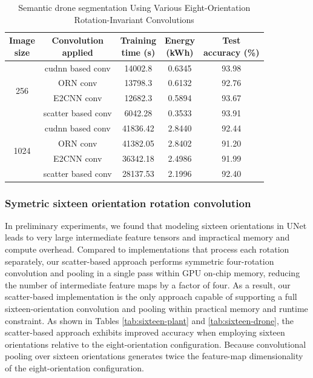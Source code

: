 \begin{table}[ht]
\centering
\caption{Semantic drone segmentation Using Various Eight-Orientation Rotation-Invariant Convolutions}
\renewcommand{\arraystretch}{1.2}
\begin{tabular}{c|c|c|c|c} 
\hline\hline
\shortstack{Image\\size} & 
\shortstack{Convolution\\applied} & 
\shortstack{Training\\time (s)} &  
\shortstack{Energy\\(kWh)} &  
\shortstack{Test\\accuracy (\%)} \\ 
\hline
\hline
\multirow{4}{*}{256} 
 & cudnn based conv    &14002.8  &0.6345 &93.98  \\ \cline{2-5}
 & ORN conv    &13798.3  &0.6132  &92.76  \\ \cline{2-5}
 & E2CNN conv    &12682.3 &0.5894  &93.67  \\ \cline{2-5}
 & scatter based conv  &6042.28  & 0.3533 &93.91  \\
\hline
\multirow{4}{*}{1024}
  & cudnn based conv    &41836.42  &2.8440 &92.44 \\ \cline{2-5}
  & ORN conv            &41382.05  &2.8402 &91.20 \\ \cline{2-5}
  & E2CNN conv          &36342.18  &2.4986 &91.99 \\ \cline{2-5}
  & scatter based conv  &28137.53  &2.1996 &92.40 \\
\hline
\end{tabular}
\label{tab:eight-drone}
\end{table}


\subsubsection{Symetric sixteen orientation rotation convolution}\label{subsubsec:sixteenOri}
In preliminary experiments, we found that modeling sixteen orientations in UNet leads to very large intermediate feature tensors and impractical memory and compute overhead. Compared to implementations that process each rotation separately, our scatter-based approach performs symmetric four-rotation convolution and pooling in a single pass within GPU on-chip memory, reducing the number of intermediate feature maps by a factor of four. As a result, our scatter-based implementation is the only approach capable of supporting a full sixteen-orientation convolution and pooling within practical memory and runtime constraint. As shown in Tables \ref{tab:sixteen-plant} and \ref{tab:sixteen-drone}, the scatter-based approach exhibits improved accuracy when employing sixteen orientations relative to the eight-orientation configuration. Because convolutional pooling over sixteen orientations generates twice the feature-map dimensionality of the eight-orientation configuration.

